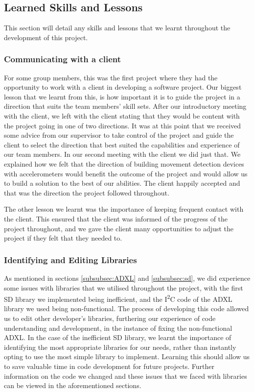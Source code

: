         \subsection{Learned Skills and Lessons}

            This section will detail any skills and lessons that we learnt throughout the development of this project.

            \subsubsection{Communicating with a client}

                For some group members, this was the first project where they had the opportunity to work with a client in developing a software project. Our biggest lesson that we learnt from this, is how important it is to guide the project in a direction that suits the team members' skill sets. After our introductory meeting with the client, we left with the client stating that they would be content with the project going in one of two directions. It was at this point that we received some advice from our supervisor to take control of the project and guide the client to select the direction that best suited the capabilities and experience of our team members. In our second meeting with the client we did just that. We explained how we felt that the direction of building movement detection devices with accelerometers would benefit the outcome of the project and would allow us to build a solution to the best of our abilities. The client happily accepted and that was the direction the project followed throughout.
                
                The other lesson we learnt was the importance of keeping frequent contact with the client. This ensured that the client was informed of the progress of the project throughout, and we gave the client many opportunities to adjust the project if they felt that they needed to.

            \subsubsection{Identifying and Editing Libraries}

                As mentioned in sections \ref{subsubsec:ADXL} and \ref{subsubsec:sd}, we did experience some issues with libraries that we utilised throughout the project, with the first SD library we implemented being inefficient, and the I\textsuperscript{2}C code of the ADXL library we used being non-functional. The process of developing this code allowed us to edit other developer's libraries, furthering our experience of code understanding and development, in the instance of fixing the non-functional ADXL. In the case of the inefficient SD library, we learnt the importance of identifying the most appropriate libraries for our needs, rather than instantly opting to use the most simple library to implement. Learning this should allow us to save valuable time in code development for future projects.
                Further information on the code we changed and these issues that we faced with libraries can be viewed in the aforementioned sections.

